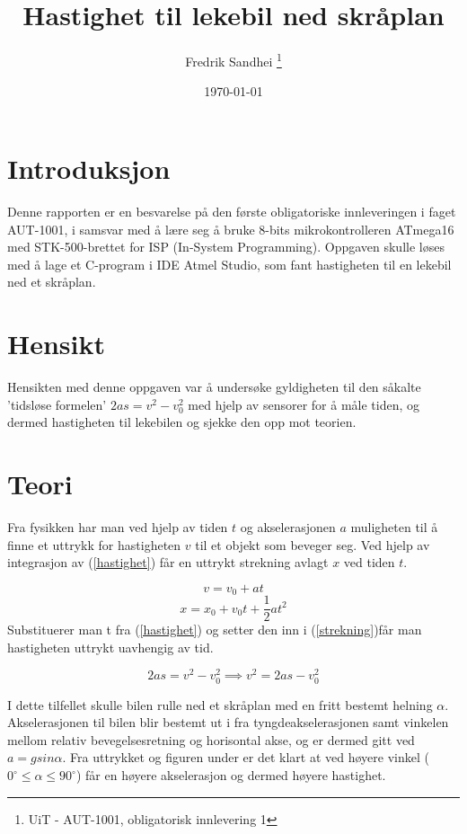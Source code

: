 \documentclass[11pt, a4paper]{report}
\begin{document}
\title{Hastighet til lekebil ned skråplan}
\author{Fredrik Sandhei \thanks{UiT - AUT-1001, obligatorisk innlevering 1}}
\date{\today}
\maketitle
\newpage
\tableofcontents
\newpage

\section{Introduksjon}
Denne rapporten er en besvarelse på den første obligatoriske innleveringen i faget AUT-1001, i samsvar med å lære seg å bruke 8-bits mikrokontrolleren ATmega16 med STK-500-brettet for ISP (In-System Programming). Oppgaven skulle løses med å lage et C-program i IDE Atmel Studio, som fant hastigheten til en lekebil ned et skråplan. 

\section{Hensikt}
Hensikten med denne oppgaven var å undersøke gyldigheten til den såkalte 'tidsløse formelen' $ 2as = v^{2} - v_{0}^{2} $ med hjelp av sensorer for å måle tiden, og dermed hastigheten til lekebilen og sjekke den opp mot teorien.

\section{Teori}
Fra fysikken har man ved hjelp av tiden $t$ og akselerasjonen $a$ muligheten til å finne et uttrykk for hastigheten $v$ til et objekt som beveger seg. Ved hjelp av integrasjon av (\ref{hastighet}) får en uttrykt strekning avlagt $x$ ved tiden $t$.

\begin{equation} \label{hastighet}
v = v_{0} + at
\end{equation}
\begin{equation} \label{strekning}
x = x_{0} + v_{0}t + \frac{1}{2}at^{2}
\end{equation}
Substituerer man t fra (\ref{hastighet}) og setter den inn i (\ref{strekning})får man hastigheten uttrykt uavhengig av tid.

\begin{equation}
2as = v^{2}-v_{0}^{2} \implies v^{2} = 2as-v_{0}^{2}
\end{equation}
\newline

I dette tilfellet skulle bilen rulle ned et skråplan med en fritt bestemt helning $\alpha$. Akselerasjonen til bilen blir bestemt ut i fra tyngdeakselerasjonen samt vinkelen mellom relativ bevegelsesretning og horisontal akse, og er dermed gitt ved $a = gsin \alpha$. Fra uttrykket og figuren under er det klart at ved høyere vinkel ($0^\circ \leq\alpha\leq 90^\circ$) får en høyere akselerasjon og dermed høyere hastighet.\newline
\end{document}
